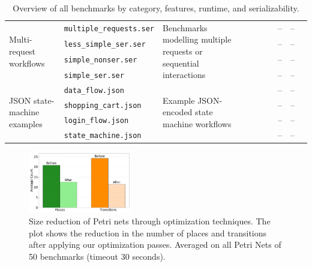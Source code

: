 \begin{table}[ht]
{\begin{tabular}{%
				l   %
				l   %
				p{5cm}   %
				cccc  %
				rr    %
				c     %
			}
			\multirow{4}{*}{Multi-request workflows}
			& \texttt{multiple\_requests.ser}
			& \multirow{4}{5cm}{Benchmarks modelling multiple requests or sequential interactions}
			&  &  &  &  & -- & -- & \cmark \\
			& \texttt{less\_simple\_ser.ser}
			& 
			&  & \cmark &  & \cmark & -- & -- &  \\
			& \texttt{simple\_nonser.ser}
			& 
			&  &  &  &  & -- & -- &  \\
			& \texttt{simple\_ser.ser}
			& 
			&  &  &  & \cmark & -- & -- & \cmark \\
			\midrule
			
			\multirow{4}{*}{JSON state-machine examples}
			& \texttt{data\_flow.json}
			& \multirow{4}{5cm}{Example JSON-encoded state machine workflows}
			&  &  &  &  & -- & -- &  \\
			& \texttt{shopping\_cart.json}
			& 
			&  &  &  &  & -- & -- &  \\
			& \texttt{login\_flow.json}
			& 
			&  &  &  &  & -- & -- &  \\
			& \texttt{state\_machine.json}
			& 
			&  &  &  &  & -- & -- &  \\
			
			\bottomrule
		\end{tabular}%
	}
	\caption{Overview of all benchmarks by category, features, runtime, and serializability.}
	\label{tab:benchmarks}
\end{table}


\begin{figure}[htbp]
	\centering
	\includegraphics[width=0.4\textwidth]{plots/petri_size_reduction_plot.pdf}
	\caption{Size reduction of Petri nets through optimization techniques. The plot shows the reduction in the number of places and transitions after applying our optimization passes. Averaged on all Petri Nets of 50 benchmarks (timeout 30 seconds).}
	\label{fig:petri_size_reduction}
\end{figure}


